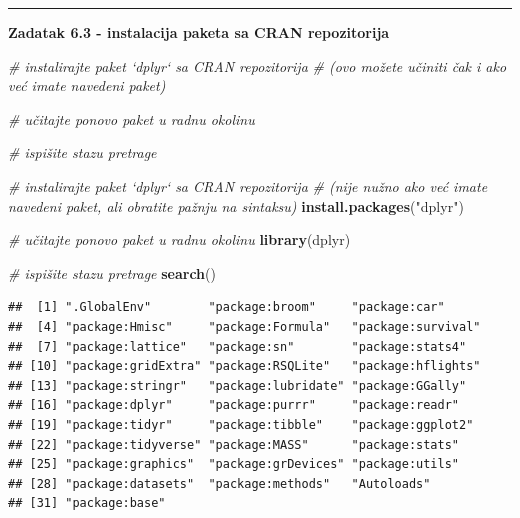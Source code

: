 \documentclass[]{book}
\newenvironment{Shaded}{\begin{snugshade}}{\end{snugshade}}
\newcommand{\KeywordTok}[1]{\textcolor[rgb]{0.13,0.29,0.53}{\textbf{#1}}}
\newcommand{\StringTok}[1]{\textcolor[rgb]{0.31,0.60,0.02}{#1}}
\newcommand{\CommentTok}[1]{\textcolor[rgb]{0.56,0.35,0.01}{\textit{#1}}}
\newcommand{\NormalTok}[1]{#1}
\theoremstyle{definition}
\theoremstyle{definition}
\theoremstyle{definition}
\theoremstyle{remark}
\begin{document}
\begin{center}\rule{0.5\linewidth}{\linethickness}\end{center}

\textbf{Zadatak 6.3 - instalacija paketa sa CRAN repozitorija}

\begin{Shaded}
\begin{Highlighting}[]
\CommentTok{# instalirajte paket `dplyr` sa CRAN repozitorija}
\CommentTok{# (ovo možete učiniti čak i ako već imate navedeni paket)}

\CommentTok{# učitajte ponovo paket u radnu okolinu}

\CommentTok{# ispišite stazu pretrage}
\end{Highlighting}
\end{Shaded}

\begin{Shaded}
\begin{Highlighting}[]
\CommentTok{# instalirajte paket `dplyr` sa CRAN repozitorija}
\CommentTok{# (nije nužno ako već imate navedeni paket, ali obratite pažnju na sintaksu)}
\KeywordTok{install.packages}\NormalTok{(}\StringTok{"dplyr"}\NormalTok{)}


\CommentTok{# učitajte ponovo paket u radnu okolinu}
\KeywordTok{library}\NormalTok{(dplyr)}
\end{Highlighting}
\end{Shaded}

\begin{Shaded}
\begin{Highlighting}[]
\CommentTok{# ispišite stazu pretrage}
\KeywordTok{search}\NormalTok{()}
\end{Highlighting}
\end{Shaded}

\begin{verbatim}
##  [1] ".GlobalEnv"        "package:broom"     "package:car"      
##  [4] "package:Hmisc"     "package:Formula"   "package:survival" 
##  [7] "package:lattice"   "package:sn"        "package:stats4"   
## [10] "package:gridExtra" "package:RSQLite"   "package:hflights" 
## [13] "package:stringr"   "package:lubridate" "package:GGally"   
## [16] "package:dplyr"     "package:purrr"     "package:readr"    
## [19] "package:tidyr"     "package:tibble"    "package:ggplot2"  
## [22] "package:tidyverse" "package:MASS"      "package:stats"    
## [25] "package:graphics"  "package:grDevices" "package:utils"    
## [28] "package:datasets"  "package:methods"   "Autoloads"        
## [31] "package:base"
\end{verbatim}
\end{document}
